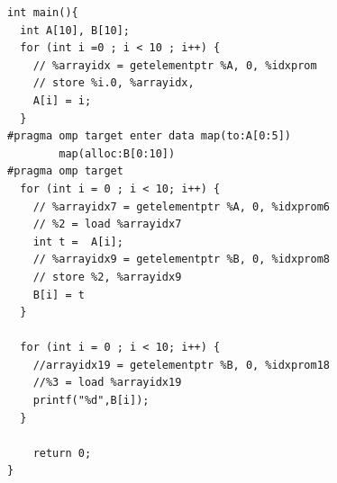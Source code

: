 \begin{minipage}{.6\textwidth}
\begin{lstlisting}[style=customc, basicstyle=\tiny, caption={Example of MemorySSA}, label=memorySSa-impl-code]
int main(){
  int A[10], B[10];                                                                                      
  for (int i =0 ; i < 10 ; i++) {    
    // %arrayidx = getelementptr %A, 0, %idxprom
    // store %i.0, %arrayidx,
    A[i] = i;
  }
#pragma omp target enter data map(to:A[0:5]) 
        map(alloc:B[0:10])                                          
#pragma omp target
  for (int i = 0 ; i < 10; i++) {
    // %arrayidx7 = getelementptr %A, 0, %idxprom6
    // %2 = load %arrayidx7            
    int t =  A[i];    
    // %arrayidx9 = getelementptr %B, 0, %idxprom8
    // store %2, %arrayidx9    
    B[i] = t
  }

  for (int i = 0 ; i < 10; i++) {    
    //arrayidx19 = getelementptr %B, 0, %idxprom18       
    //%3 = load %arrayidx19    
    printf("%d",B[i]);
  }

    return 0;
}
\end{lstlisting}
\end{minipage}
